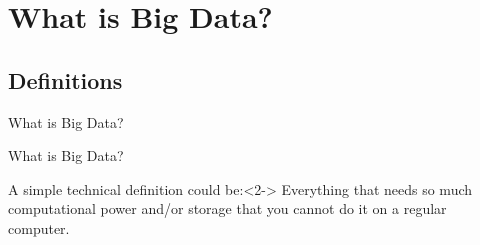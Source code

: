 \documentclass{beamer}
\begin{document}
\section{What is Big Data?}
\subsection{Definitions}

\begin{frame}
What is Big Data?
\end{frame}


{
\begin{frame}[plain]
\end{frame}
}



\begin{frame}{What is Big Data?}
\begin{block}{A simple technical definition could be:}<2->
Everything that needs so much computational power and/or storage that you cannot do it on a regular computer.
\end{block}
\end{frame}
\end{document}

